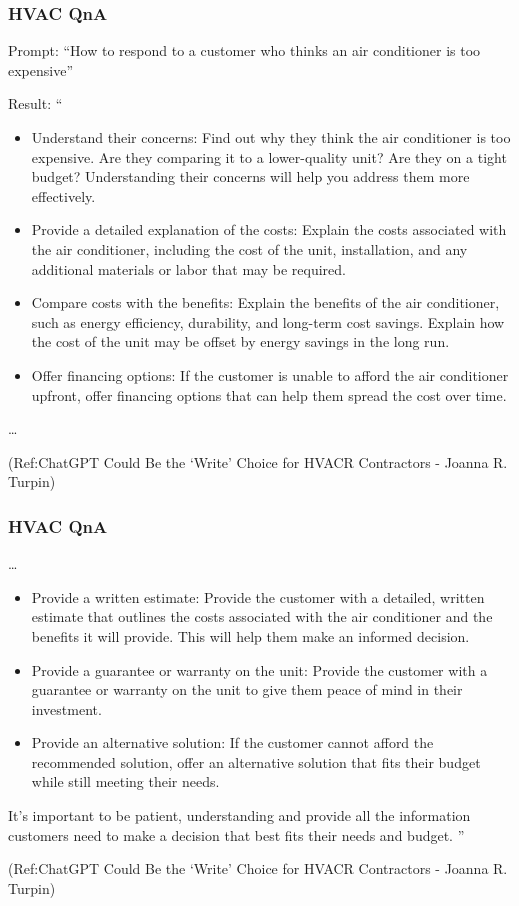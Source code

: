 \begin{frame}[fragile]\frametitle{HVAC QnA}
Prompt: ``How to respond to a customer who thinks an air conditioner is
too expensive''

Result: ``
\begin{itemize}
\item Understand their concerns: Find out why they think the air conditioner is too expensive.
Are they comparing it to a lower-quality unit? Are they on a tight budget? Understanding
their concerns will help you address them more effectively.
\item Provide a detailed explanation of the costs: Explain the costs associated with the air
conditioner, including the cost of the unit, installation, and any additional materials or labor
that may be required.
\item Compare costs with the benefits: Explain the benefits of the air conditioner, such as
energy efficiency, durability, and long-term cost savings. Explain how the cost of the unit may
be offset by energy savings in the long run.
\item Offer financing options: If the customer is unable to afford the air conditioner upfront,
offer financing options that can help them spread the cost over time.

\end{itemize}	 

\ldots

\tiny{(Ref:ChatGPT Could Be the ‘Write’ Choice for HVACR Contractors - Joanna R. Turpin)}
\end{frame}

\begin{frame}[fragile]\frametitle{HVAC QnA}

\ldots 

\begin{itemize}
\item Provide a written estimate: Provide the customer with a detailed, written estimate that
outlines the costs associated with the air conditioner and the benefits it will provide. This will
help them make an informed decision.
\item Provide a guarantee or warranty on the unit: Provide the customer with a guarantee
or warranty on the unit to give them peace of mind in their investment.
\item Provide an alternative solution: If the customer cannot afford the recommended
solution, offer an alternative solution that fits their budget while still meeting their needs.
\end{itemize}	 
It's important to be patient, understanding and provide all the information customers need to
make a decision that best fits their needs and budget.
''

\tiny{(Ref:ChatGPT Could Be the ‘Write’ Choice for HVACR Contractors - Joanna R. Turpin)}
\end{frame}

